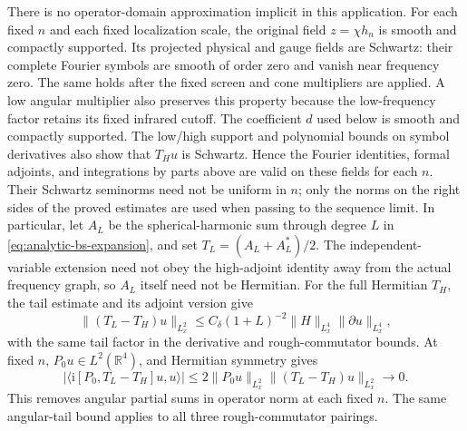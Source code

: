 \documentclass[11pt,a4paper]{article}
\numberwithin{equation}{section}
\newcommand{\R}{\mathbb R}
\newcommand{\ii}{\mathrm{i}}
\theoremstyle{definition}
\begin{document}
There is no operator-domain approximation implicit in this application.
For each fixed $n$ and each fixed localization scale, the original field
$z=\chi h_n$ is smooth and compactly supported. Its projected physical
and gauge fields are Schwartz: their complete Fourier symbols are smooth
of order zero and vanish near frequency zero. The same holds after the
fixed screen and cone multipliers are applied. A low angular multiplier
also preserves this property because the low-frequency factor retains its fixed
infrared cutoff. The coefficient $d$ used below is smooth and compactly
supported. The low/high support and polynomial bounds on symbol
derivatives also show that $T_Hu$ is Schwartz. Hence the Fourier identities, formal adjoints, and integrations
by parts above are valid on these fields for each $n$. Their Schwartz
seminorms need not be uniform in $n$; only the norms on the right sides
of the proved estimates are used when passing to the sequence limit.
In particular, let $A_L$ be the spherical-harmonic sum through degree
$L$ in \eqref{eq:analytic-bs-expansion}, and set
$T_L=(A_L+A_L^*)/2$. The independent-variable extension need not obey
the high-adjoint identity away from the actual frequency graph, so
$A_L$ itself need not be Hermitian. For the full Hermitian $T_H$,
the tail estimate and its adjoint version give
\begin{equation*}
\|(T_L-T_H)u\|_{L^2_x}
\leq C_\delta(1+L)^{-2}\|H\|_{L^4_x}\|\partial u\|_{L^4_x},
\end{equation*}
with the same tail factor in the derivative and rough-commutator
bounds. At fixed $n$, $P_0u\in L^2(\R^4)$, and Hermitian symmetry gives
\begin{equation*}
\big|\langle \ii [P_0,T_L-T_H]u,u\rangle\big|
\leq2\|P_0u\|_{L^2_x}\|(T_L-T_H)u\|_{L^2_x}\longrightarrow0.
\end{equation*}
This removes angular partial sums in operator norm at each fixed $n$.
The same angular-tail bound applies to all three rough-commutator pairings.
\end{document}
